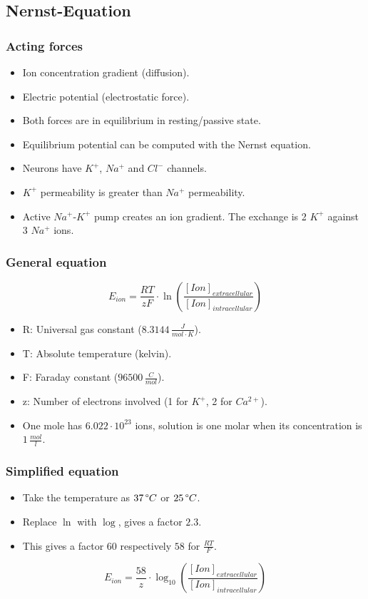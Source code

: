 \documentclass[a4paper, 12pt]{article}
\begin{document}
\subsection{Nernst-Equation}
\subsubsection{Acting forces}
\begin{itemize}[noitemsep,nolistsep]
	\item Ion concentration gradient (diffusion).
	\item Electric potential (electrostatic force).
	\item Both forces are in equilibrium in resting/passive state.
	\item Equilibrium potential can be computed with the Nernst equation.
	\item Neurons have $K^+$, $Na^+$ and $Cl^-$ channels.
	\item $K^+$ permeability is greater than $Na^+$ permeability.
	\item Active $Na^+$-$K^+$ pump creates an ion gradient. The exchange is 2 $K^+$ against 3 $Na^+$ ions.
\end{itemize}

\subsubsection{General equation}
\[E_{ion}= \frac{RT}{zF} \cdot \ln (\frac{[Ion]_{extracellular}}{[Ion]_{intracellular}})\]
\begin{itemize}[noitemsep,nolistsep]
	\item R: Universal gas constant ($8.3144\,\frac{J}{mol \cdot K}$).
	\item T: Absolute temperature (kelvin).
	\item F: Faraday constant ($ 96500\,\frac{C}{mol}$).
	\item z: Number of electrons involved (1 for $K^+$, 2 for $Ca^{2+}$).
	\item One mole has $6.022\cdot10^{23}$ ions, solution is one molar when its concentration is $1\,\frac{mol}{l}$.
\end{itemize}

\subsubsection{Simplified equation}
\begin{itemize}[noitemsep,nolistsep]
	\item Take the temperature as $37\,\degree C$ or $25\,\degree C$.
	\item Replace $\ln$ with $\log$, gives a factor $2.3$.
	\item This gives a factor $60$ respectively $58$ for $\frac{RT}{F}$.
\end{itemize}
\[E_{ion}= \frac{58}{z} \cdot \log_{10} (\frac{[Ion]_{extracellular}}{[Ion]_{intracellular}})\]
\end{document}
